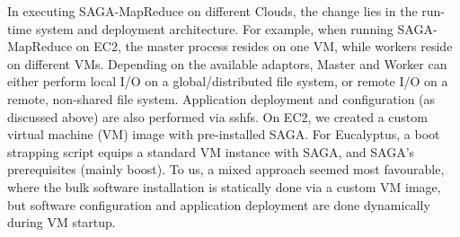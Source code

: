 \documentclass[conference,final]{IEEEtran}
\newcommand{\sagamapreduce }{SAGA-MapReduce }
\begin{document}
In executing \sagamapreduce on different Clouds, the change lies in
the run-time system and deployment architecture. For example, when
running \sagamapreduce on EC2, the master process resides on one VM,
while workers reside on different VMs.  Depending on the available
adaptors, Master and Worker can either perform local I/O on a
global/distributed file system, or remote I/O on a remote, non-shared
file system.  %
Application deployment and configuration (as discussed above) are also
performed via sshfs.  On EC2, we created a custom virtual machine
(VM) image with pre-installed SAGA.  For Eucalyptus, a boot strapping
script equips a standard VM instance with SAGA, and SAGA's
prerequisites (mainly boost).  To us, a mixed approach seemed most
favourable, where the bulk software installation is statically done
via a custom VM image, but software configuration and application
deployment are done dynamically during VM startup.
\end{document}
